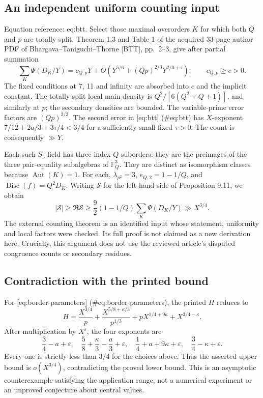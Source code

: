 \documentclass[10pt]{article}
\begin{document}
\subsection*{An independent uniform counting input}
Equation reference: eq:btt. Select those maximal overorders \(K\) for which both \(Q\) and \(p\) are totally split. Theorem 1.3 and Table 1 of the acquired 33-page author PDF of Bhargava–Taniguchi–Thorne [BTT], pp. 2–3, give after partial summation \[
 \sum_K\Psi(D_K/Y)
 =c_{Q,p}Y+
 O\!\left(Y^{5/6}+(Qp)^{2/3}Y^{2/3+\tau}\right),
 \qquad c_{Q,p}\ge c>0.\] The fixed conditions at 7, 11 and infinity are absorbed into \(c\) and the implicit constant. The totally split local main density is \(Q^2/[6(Q^2+Q+1)]\), and similarly at \(p\); the secondary densities are bounded. The variable-prime error factors are \((Qp)^{2/3}\). The second error in [eq:btt] (\#eq:btt) has \(X\)-exponent \(7/12+2a/3+3\tau/4<3/4\) for a sufficiently small fixed \(\tau>0\). The count is consequently \(\gg Y\).\par
Each such \(S_3\) field has three index-\(Q\) suborders: they are the preimages of the three pair-equality subalgebras of \(\mathbb F_Q^3\). They are distinct as isomorphism classes because \(\operatorname{Aut}(K)=1\). For each, \(\lambda_{p^2}=3\), \(e_{Q,2}=1-1/Q\), and \(\operatorname{Disc}(f)=Q^2D_K\). Writing \(\mathcal S\) for the left-hand side of Proposition 9.11, we obtain \[|\mathcal S|\ge\Re\mathcal S
 \ge \frac92(1-1/Q)\sum_K\Psi(D_K/Y)
 \gg X^{3/4}.\] The external counting theorem is an identified input whose statement, uniformity and local factors were checked. Its full proof is not claimed as a new derivation here. Crucially, this argument does not use the reviewed article’s disputed congruence counts or secondary residues.\par
\subsection*{Contradiction with the printed bound}
For [eq:border-parameters] (\#eq:border-parameters), the printed \(H\) reduces to \[H=\frac{X^{3/4}}p+
    \frac{X^{5/8+\kappa/3}}{p^{1/3}}+
    pX^{1/4+9\kappa}+X^{3/4-\kappa}.\] After multiplication by \(X^\varepsilon\), the four exponents are \[\frac34-a+\varepsilon,\quad
 \frac58+\frac{\kappa}3-\frac a3+\varepsilon,\quad
 \frac14+a+9\kappa+\varepsilon,\quad
 \frac34-\kappa+\varepsilon.\] Every one is strictly less than \(3/4\) for the choices above. Thus the asserted upper bound is \(o(X^{3/4})\), contradicting the proved lower bound. This is an asymptotic counterexample satisfying the application range, not a numerical experiment or an unproved conjecture about central values.\par
\end{document}
